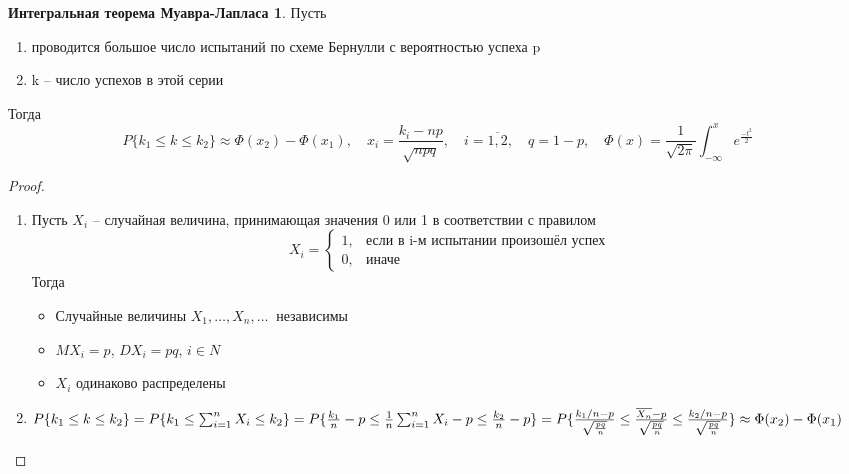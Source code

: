 \documentclass[a4paper, 12pt]{article}
\theoremstyle{definition}
\theoremstyle{leads}
\theoremstyle{example}
\newcommand{\infseq}[3]{%
	\ensuremath{#1_#2, \dots, #1_#3, \dots}\ }
\newcommand{\infseqX}{%
	\infseq{X}{1}{n}}
\begin{document}
\newtheorem*{mlap}{Интегральная теорема Муавра-Лапласа}
\begin{mlap}
	Пусть 
	\begin{enumerate}
	  \item проводится большое число испытаний по схеме Бернулли с вероятностью успеха p
	  \item k -- число успехов в этой серии 
	\end{enumerate}
Тогда 
\begin{displaymath}
	P\{k_1 \leq k \leq k_2\} \approx \Phi(x_2) - \Phi(x_1), \quad  x_i = \frac{k_i - np}{\sqrt{npq}}, \quad i = \overline{1,2}, \quad q = 1 - p, \quad 
	\Phi(x) = \frac{1}{\sqrt{2 \pi}} \int_{-\infty}^{x} e^{\frac{-t^2}{2}}
\end{displaymath}
\end{mlap}
\begin{proof}
	\begin{enumerate}
		\item Пусть $X_i$ -- случайная величина, принимающая значения 0 или 1 в соответствии с правилом
	    \begin{displaymath}
		X_i = \begin{cases}
		1, & \text{если в i-м испытании произошёл успех}\\
		0, & \text{иначе}
		\end{cases}
		\end{displaymath}
	Тогда 
	\begin{itemize}
		\item Случайные величины $\infseqX$ независимы
		\item $MX_i = p$, $DX_i = pq$, $i \in N$
		\item $X_i$ одинаково распределены
	\end{itemize}
 \item
 	 	$P\{k_1 \leq k \leq k_2\} = P\{k_1 \leq \sum_{i=1}^{n}X_i \leq k_2\} = P\{\frac{k_1}{n} - p \leq \frac{1}{n}\sum_{i=1}^{n} X_i - p \leq \frac{k_2}{n} - p\} =	\\
 	P\{\frac{k_1/n - p}{\sqrt{\frac{pq}{n}}} \leq \frac{\overline{X_n} - p}{\sqrt{\frac{pq}{n}}} \leq \frac{k_2/n - p}{\sqrt{\frac{pq}{n}}}\} \approx \Phi(x_2) - \Phi(x_1)$
	\end{enumerate}
\end{proof}
\end{document}
